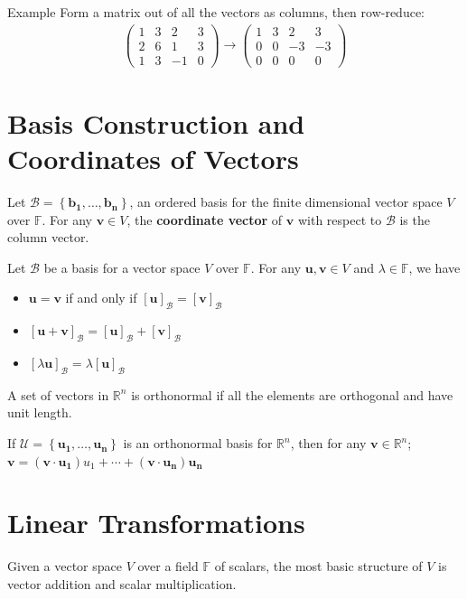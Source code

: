 \documentclass{report}
\renewcommand{\vec}{\mathbf}
\newcommand{\cvec}[1]{ \begin{pmatrix} #1 \end{pmatrix} }
\begin{document}
\begin{enumerate}
\begin{question}{Example}
			Form a matrix out of all the vectors as columns, then row-reduce:
				\begin{align*}
					\cvec{1 & 3 & 2 & 3\\2&6&1&3\\1&3&-1&0} \longrightarrow \cvec{1&3&2&3\\0&0&-3&-3\\0&0&0&0}
				\end{align*}
		\end{question}

\chapter{Basis Construction and Coordinates of Vectors}

	Let $\mathcal{B} = \left\{\vec{b_1}, \dots, \vec{b_n}\right\}$, an ordered basis for the finite dimensional vector space $V$ over $\mathbb{F}$. For any $\vec{v} \in V$, the \textbf{coordinate vector} of $\vec{v}$ with respect to $\mathcal{B}$ is the column vector.

	Let $\mathcal{B}$ be a basis for a vector space $V$ over $\mathbb{F}$. For any $\vec{u}, \vec{v} \in V$ and $\lambda \in \mathbb{F}$, we have
	\begin{itemize}
		\item $\vec{u} = \vec{v}$ if and only if $[\vec{u}]_\mathcal{B} = [\vec{v}]_\mathcal{B}$
		\item $[\vec{u} + \vec{v}]_\mathcal{B} = [\vec{u}]_\mathcal{B} + [\vec{v}]_\mathcal{B}$
		\item $[\lambda \vec{u}]_\mathcal{B} = \lambda [\vec{u}]_\mathcal{B}$
	\end{itemize}

	A set of vectors in $\mathbb{R}^n$ is orthonormal if all the elements are orthogonal and have unit length.

	If $\mathcal{U} = \left\{\vec{u_1}, \dots, \vec{u_n}\right\}$ is an orthonormal basis for $\mathbb{R}^n$, then for any $\vec{v} \in \mathbb{R}^n$; $\vec{v} = (\vec{v} \cdot \vec{u_1})u_1 + \cdots + (\vec{v} \cdot \vec{u_n})\vec{u_n}$

\chapter{Linear Transformations}

	Given a vector space $V$ over a field $\mathbb{F}$ of scalars, the most basic structure of $V$ is vector addition and scalar multiplication.
	

\end{enumerate}
\end{document}
